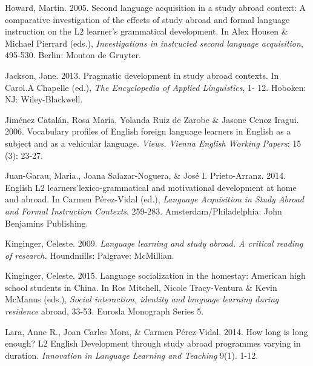\begin{styleStandard}
Howard, Martin. 2005. Second language acquisition in a study abroad context: A comparative investigation of the effects of study abroad and formal language instruction on the L2 learner’s grammatical development. In Alex Housen \& Michael Pierrard (eds.), \textit{Investigations in instructed second language acquisition}, 495-530. Berlin: Mouton de Gruyter.
\end{styleStandard}


\begin{styleStandard}
Jackson, Jane. 2013. Pragmatic development in study abroad contexts. In Carol.A Chapelle (ed.), \textit{The Encyclopedia of Applied Linguistics}, 1- 12. Hoboken: NJ: Wiley-Blackwell. 
\end{styleStandard}


\begin{styleStandard}
Jiménez Catalán, Rosa María, Yolanda Ruiz de Zarobe \& Jasone Cenoz Iragui. 2006. Vocabulary profiles of English foreign language learners in English as a subject and as a vehicular language. \textit{Views. Vienna English Working Papers}: 15 (3): 23-27. 
\end{styleStandard}


\begin{styleStandard}
Juan-Garau, Maria., Joana Salazar-Noguera, \& José I. Prieto-Arranz. 2014. English L2 learners’lexico-grammatical and motivational development at home and abroad. In Carmen Pérez-Vidal (ed.), \textit{Language Acquisition }\textit{in Study Abroad and Formal Instruction Contexts}, 259-283. Amsterdam/Philadelphia: John Benjamins Publishing. 
\end{styleStandard}


\begin{styleStandard}
Kinginger, Celeste. 2009. \textit{Language learning and study abroad. A critical reading of research. }Houndmills: Palgrave: McMillian.
\end{styleStandard}


\begin{styleStandard}
Kinginger, Celeste. 2015. Language socialization in the homestay: American high school students in China. In Ros Mitchell, Nicole Tracy-Ventura \& Kevin McManus (eds.), \textit{Social interaction, identity and language learning during residence }abroad, 33-53\textit{. }Eurosla Monograph Series 5.
\end{styleStandard}


\begin{styleStandard}
Lara, Anne R., Joan Carles Mora, \& Carmen Pérez-Vidal. 2014. How long is long enough? L2 English Development through study abroad programmes varying in duration. \textit{Innovation in Language Learning and Teaching }9(1). 1-12. 
\end{styleStandard}


